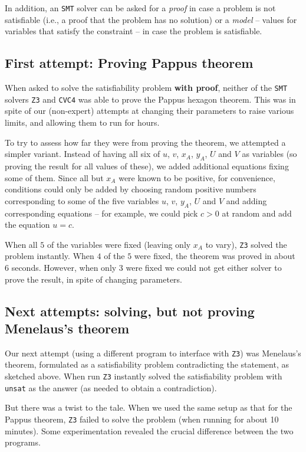 \documentclass{amsart}
\theoremstyle{plain}
\theoremstyle{definition}
\theoremstyle{remark}
\begin{document}
In addition, an \texttt{SMT} solver can be asked for a
\emph{proof} in case a problem is not satisfiable (i.e., a proof that
the problem has no solution) or a \emph{model} -- values for variables
that satisfy the constraint -- in case the problem is satisfiable.

\subsection{First attempt: Proving Pappus theorem}

When asked to solve the satisfiability problem \textbf{with proof}, 
neither of the \texttt{SMT} solvers \texttt{Z3} and \texttt{CVC4} was able to
prove the Pappus hexagon theorem. This was in spite of our (non-expert)
attempts at changing their parameters to raise various limits, 
and allowing them to run for hours.

To try to assess how far they were from proving the theorem, we attempted
a simpler variant. Instead of having all six of \(u\), \(v\), \(x_A\),
\(y_A\), \(U\) and \(V\) as variables (so proving the result for all
values of these), we added additional equations fixing some of them.
Since all but \(x_A\) were known to be positive, for convenience,
conditions could only be added by choosing random positive numbers
corresponding to some of the five variables \(u\), \(v\), \(y_A\), \(U\)
and \(V\) and adding corresponding equations -- for example, we could
pick \(c > 0\) at random and add the equation \(u = c\).

When all \(5\) of the variables were fixed (leaving only \(x_A\) to
vary), \texttt{Z3} solved the problem instantly. When \(4\) of the \(5\) were
fixed, the theorem was proved in about 6 seconds. However, when only
\(3\) were fixed we could not get either solver to prove the result, in
spite of changing parameters.

\subsection{Next attempts: solving, but not proving Menelaus's theorem}

Our next attempt (using a different program to interface with \texttt{Z3}) was Menelaus's theorem,
formulated as a satisfiability problem contradicting the
statement, as sketched above. When run \texttt{Z3} instantly solved the satisfiability problem
with \texttt{unsat} as the answer (as needed to obtain a contradiction).

But there was a twist to the tale. When we used the same setup as that for the Pappus theorem,
\texttt{Z3} failed to solve the problem (when running for about 10
minutes). Some experimentation revealed the crucial difference between
the two programs.
\end{document}
